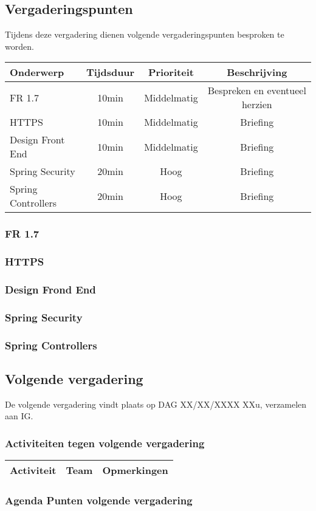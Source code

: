 \subsection{Vergaderingspunten}
Tijdens deze vergadering dienen volgende vergaderingspunten besproken te worden.
\begin{table} [H]
	\centering
	\begin{tabular} {l|c|c|c}
		Onderwerp & Tijdsduur & Prioriteit & Beschrijving \\ %
		\hline
		FR 1.7 & 10min & Middelmatig & Bespreken en eventueel herzien \\
		HTTPS & 10min & Middelmatig & Briefing \\
		Design Front End & 10min & Middelmatig & Briefing \\
		Spring Security & 20min & Hoog & Briefing \\
		Spring Controllers & 20min & Hoog & Briefing \\
	\end{tabular}
\end{table}

\subsubsection{FR 1.7}

\subsubsection{HTTPS}

\subsubsection{Design Frond End}

\subsubsection{Spring Security}

\subsubsection{Spring Controllers}

\subsection{Volgende vergadering}
De volgende vergadering vindt plaats op DAG XX/XX/XXXX XXu, verzamelen aan IG.
\subsubsection{Activiteiten tegen volgende vergadering} \label{sec:TODOActiviteiten}
\begin{table} [H]
	\centering
	\begin{tabular} {l|l|l}
		\textbf{Activiteit} & \textbf{Team} & \textbf{Opmerkingen} \\
		\hline

	\end{tabular}
\end{table}

\subsubsection{Agenda Punten volgende vergadering}